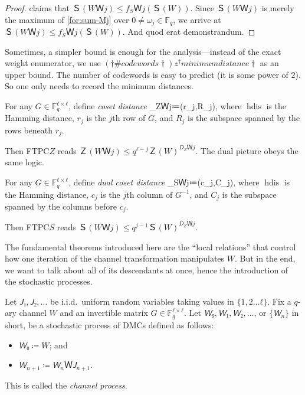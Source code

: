 \documentclass[openany]{amsbook}
\numberwithin{equation}{chapter}
\numberwithin{figure}{chapter}
\numberwithin{table}{chapter}
\DeclareMathOperator\hdis{hdis}
\def\[#1\]{\begin{equation*}{#1}\end{equation*}}
\theoremstyle{definition}	理dfn:Definition~?s			理exa:Example~?s
\theoremstyle{remark}		理cla:Claim~?s				理rem:Remark~?s
\begin{document}
\begin{proof}
		 claims that $Ｓ(WＷj)≤f_SＷj(Ｓ(W))$.
		Since $Ｓ(WＷj)$ is merely the maximum of \cref{for:sum-Mj}
		over $0≠ω_j∈𝔽_q$, we arrive at $Ｓ(WＷj)≤f_SＷj(Ｓ(W))$.
		And quod erat demonstrandum.
	\end{proof}
	
	Sometimes, a simpler bound is enough for the analysis---instead of the exact
	weight enumerator, we use $(†\#codewords†)z^†minimum distance†$ as an upper bound.
	The number of codewords is easy to predict (it is some power of $2$).
	So one only needs to record the minimum distances.
	
	\begin{dfn}
		For any $G∈𝔽_q^{ℓ×ℓ}$, define \emph{coset distance}
		\[D_ZＷj≔\hdis(r_j,R_j),\]
		where $\hdis$ is the Hamming distance, $r_j$ is the $j$th row of $G$,
		and $R_j$ is the subspace spanned by the rows beneath $r_j$.
	\end{dfn}
	
	Then FTPC$Z$ reads $Ｚ(WＷj)≤q^{ℓ-j}Ｚ(W)^{D_ZＷj}$.
	The dual picture obeys the same logic.
	
	\begin{dfn}
		For any $G∈𝔽_q^{ℓ×ℓ}$, define \emph{dual coset distance}
		\[D_SＷj≔\hdis(c_j,C_j),\]
		where $\hdis$ is the Hamming distance, $c_j$ is the $j$th column of $G^{-1}$,
		and $C_j$ is the subspace spanned by the columns before $c_j$.
	\end{dfn}
	
	Then FTPC$S$ reads $Ｓ(WＷj)≤q^{j-1}Ｓ(W)^{D_ZＷj}$.
	
	The fundamental theorems introduced here are the “local relations” that
	control how one iteration of the channel transformation manipulates $W$.
	But in the end, we want to talk about all of its descendants at once,
	hence the introduction of the stochastic processes.
	
	\begin{dfn}
		Let $𝘑₁,𝘑₂,\dotsc$ be i.i.d.\ uniform
		random variables taking values in $\{1,2…ℓ\}$.
		Fix a $q$-ary channel $W$ and an invertible matrix $G∈𝔽_q^{ℓ×ℓ}$.
		Let $𝘞₉,𝘞₁,𝘞₂,\dotsc$, or $\{𝘞_n\}$ in short,
		be a stochastic process of DMCs defined as follows:
		\begin{itemize}
			\item	$𝘞₀≔W$; and
			\item	$𝘞_{n+1}≔𝘞_nＷ{𝘑_{n+1}}$.
		\end{itemize}
		This is called the \emph{channel process}.
	\end{dfn}
	
\end{document}
